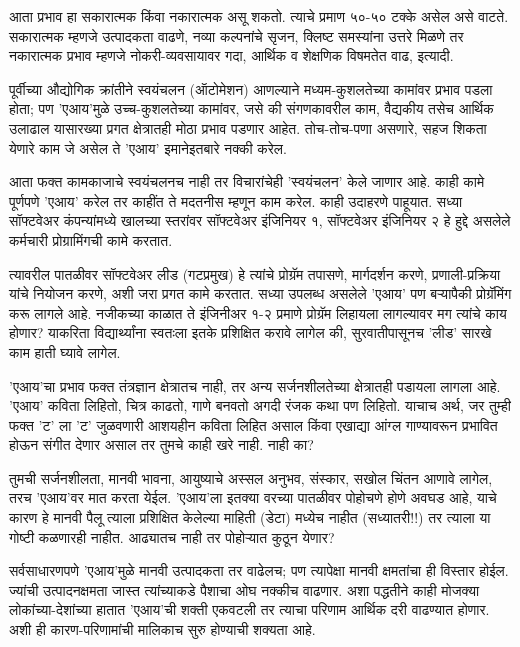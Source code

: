 आता प्रभाव हा सकारात्मक किंवा नकारात्मक असू शकतो. त्याचे प्रमाण ५०-५० टक्के असेल असे वाटते. सकारात्मक म्हणजे उत्पादकता वाढणे, नव्या कल्पनांचे सृजन, क्लिष्ट समस्यांना उत्तरे मिळणे तर नकारात्मक प्रभाव म्हणजे नोकरी-व्यवसायावर गदा, आर्थिक व शेक्षणिक विषमतेत वाढ, इत्यादी.

पूर्वीच्या औद्योगिक क्रांतीने स्वयंचलन (ऑटोमेशन) आणल्याने मध्यम-कुशलतेच्या कामांवर प्रभाव पडला होता; पण 'एआय'मुळे उच्च-कुशलतेच्या कामांवर, जसे की संगणकावरील काम, वैद्यकीय तसेच आर्थिक उलाढाल यासारख्या प्रगत क्षेत्रातही मोठा प्रभाव पडणार आहेत. तोच-तोच-पणा असणारे, सहज शिकता येणारे काम जे असेल ते 'एआय' इमानेइतबारे नक्की करेल.

आता फक्त कामकाजाचे स्वयंचलनच नाही तर विचारांचेही 'स्वयंचलन' केले जाणार आहे. काही कामे पूर्णपणे 'एआय' करेल तर काहींत ते मदतनीस म्हणून काम करेल. काही उदाहरणे पाहूयात. सध्या सॉफ्टवेअर कंपन्यांमध्ये खालच्या  स्तरांवर  सॉफ्टवेअर इंजिनियर १, सॉफ्टवेअर इंजिनियर २ हे हुद्दे असलेले कर्मचारी प्रोग्रामिंगची कामे करतात.

त्यावरील पातळीवर सॉफ्टवेअर लीड (गटप्रमुख) हे त्यांचे प्रोग्रॅम तपासणे, मार्गदर्शन करणे, प्रणाली-प्रक्रिया यांचे नियोजन करणे, अशी जरा प्रगत कामे करतात. सध्या उपलब्ध असलेले 'एआय' पण बऱ्यापैकी प्रोग्रॅमिंग करू लागले आहे. नजीकच्या काळात ते इंजिनीअर १-२ प्रमाणे प्रोग्रॅम लिहायला लागल्यावर मग त्यांचे काय होणार? याकरिता विद्यार्थ्यांना स्वतःला इतके प्रशिक्षित करावे लागेल की, सुरवातीपासूनच 'लीड' सारखे काम हाती घ्यावे लागेल.

'एआय'चा प्रभाव फक्त तंत्रज्ञान क्षेत्रातच नाही, तर अन्य सर्जनशीलतेच्या क्षेत्रातही पडायला लागला आहे. 'एआय' कविता लिहितो, चित्र काढतो, गाणे बनवतो अगदी रंजक कथा पण लिहितो. याचाच अर्थ, जर तुम्ही फक्त 'ट' ला 'ट' जुळवणारी आशयहीन कविता लिहित असाल किंवा एखाद्या आंग्ल गाण्यावरून प्रभावित होऊन संगीत देणार असाल तर तुमचे काही खरे नाही. नाही का?

तुमची सर्जनशीलता, मानवी भावना, आयुष्याचे अस्सल अनुभव, संस्कार, सखोल चिंतन आणावे लागेल, तरच 'एआय'वर मात करता येईल. 'एआय'ला इतक्या वरच्या पातळीवर पोहोचणे होणे अवघड आहे, याचे कारण हे मानवी पैलू त्याला प्रशिक्षित केलेल्या माहिती (डेटा) मध्येच नाहीत (सध्यातरी!!) तर त्याला या गोष्टी कळणारही नाहीत. आढ्यातच नाही तर पोहोऱ्यात कुठून येणार?

सर्वसाधारणपणे 'एआय'मुळे मानवी उत्पादकता तर वाढेलच; पण त्यापेक्षा मानवी क्षमतांचा ही विस्तार होईल. ज्यांची उत्पादनक्षमता जास्त त्यांच्याकडे पैशाचा ओघ नक्कीच वाढणार. अशा पद्धतीने काही मोजक्या लोकांच्या-देशांच्या हातात 'एआय'ची शक्ती एकवटली तर त्याचा परिणाम आर्थिक दरी वाढण्यात होणार. अशी ही कारण-परिणामांची मालिकाच सुरु होण्याची शक्यता आहे.


